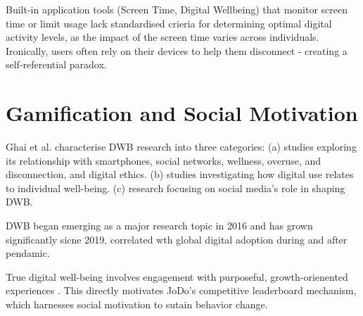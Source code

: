 \documentclass[12pt,a4paper]{report}
\begin{document}
Built-in application tools (Screen Time, Digital Wellbeing) that monitor screen time or limit usage lack standardised crieria for determining optimal digital activity levels, as the impact of the screen time varies across individuals. Ironically, users often rely on their devices to help them disconnect - creating a self-referential paradox.

\section{Gamification and Social Motivation}
Ghai et al. \citep{ghai2023digital} characterise DWB research into three categories: (a) studies exploring its relationship with smartphones, social networks, wellness, overuse, and disconnection, and digital ethics. (b) studies investigating how digital use relates to individual well-being. (c) research focusing on social media's role in shaping DWB.

DWB began emerging as a major research topic in 2016 and has grown significantly sicne 2019, correlated wth global digital adoption during and after pendamic.

True digital well-being involves engagement with purposeful, growth-orienented experiences \citep{hutmacher2022personalization}. This directly motivates JoDo's competitive leaderboard mechanism, which harnesses social motivation to sutain behavior change.
 \newpage


\end{document}
